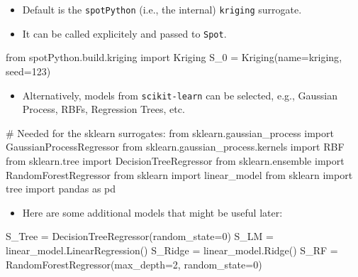 \documentclass[
  letterpaper,
  DIV=11,
  numbers=noendperiod]{scrreprt}
\newenvironment{Shaded}{\begin{snugshade}}{\end{snugshade}}
\newcommand{\CommentTok}[1]{\textcolor[rgb]{0.37,0.37,0.37}{#1}}
\newcommand{\DecValTok}[1]{\textcolor[rgb]{0.68,0.00,0.00}{#1}}
\newcommand{\ImportTok}[1]{\textcolor[rgb]{0.00,0.46,0.62}{#1}}
\newcommand{\NormalTok}[1]{\textcolor[rgb]{0.00,0.23,0.31}{#1}}
\newcommand{\OperatorTok}[1]{\textcolor[rgb]{0.37,0.37,0.37}{#1}}
\newcommand{\StringTok}[1]{\textcolor[rgb]{0.13,0.47,0.30}{#1}}
\providecommand{\tightlist}{%
  \setlength{\itemsep}{0pt}\setlength{\parskip}{0pt}}\usepackage{longtable,booktabs,array}
\begin{document}
\begin{itemize}
\tightlist
\item
  Default is the \texttt{spotPython} (i.e., the internal)
  \texttt{kriging} surrogate.
\item
  It can be called explicitely and passed to \texttt{Spot}.
\end{itemize}

\begin{Shaded}
\begin{Highlighting}[]
\ImportTok{from}\NormalTok{ spotPython.build.kriging }\ImportTok{import}\NormalTok{ Kriging}
\NormalTok{S\_0 }\OperatorTok{=}\NormalTok{ Kriging(name}\OperatorTok{=}\StringTok{\textquotesingle{}kriging\textquotesingle{}}\NormalTok{, seed}\OperatorTok{=}\DecValTok{123}\NormalTok{)}
\end{Highlighting}
\end{Shaded}

\begin{itemize}
\tightlist
\item
  Alternatively, models from \texttt{scikit-learn} can be selected,
  e.g., Gaussian Process, RBFs, Regression Trees, etc.
\end{itemize}

\begin{Shaded}
\begin{Highlighting}[]
\CommentTok{\# Needed for the sklearn surrogates:}
\ImportTok{from}\NormalTok{ sklearn.gaussian\_process }\ImportTok{import}\NormalTok{ GaussianProcessRegressor}
\ImportTok{from}\NormalTok{ sklearn.gaussian\_process.kernels }\ImportTok{import}\NormalTok{ RBF}
\ImportTok{from}\NormalTok{ sklearn.tree }\ImportTok{import}\NormalTok{ DecisionTreeRegressor}
\ImportTok{from}\NormalTok{ sklearn.ensemble }\ImportTok{import}\NormalTok{ RandomForestRegressor}
\ImportTok{from}\NormalTok{ sklearn }\ImportTok{import}\NormalTok{ linear\_model}
\ImportTok{from}\NormalTok{ sklearn }\ImportTok{import}\NormalTok{ tree}
\ImportTok{import}\NormalTok{ pandas }\ImportTok{as}\NormalTok{ pd}
\end{Highlighting}
\end{Shaded}

\begin{itemize}
\tightlist
\item
  Here are some additional models that might be useful later:
\end{itemize}

\begin{Shaded}
\begin{Highlighting}[]
\NormalTok{S\_Tree }\OperatorTok{=}\NormalTok{ DecisionTreeRegressor(random\_state}\OperatorTok{=}\DecValTok{0}\NormalTok{)}
\NormalTok{S\_LM }\OperatorTok{=}\NormalTok{ linear\_model.LinearRegression()}
\NormalTok{S\_Ridge }\OperatorTok{=}\NormalTok{ linear\_model.Ridge()}
\NormalTok{S\_RF }\OperatorTok{=}\NormalTok{ RandomForestRegressor(max\_depth}\OperatorTok{=}\DecValTok{2}\NormalTok{, random\_state}\OperatorTok{=}\DecValTok{0}\NormalTok{)}
\end{Highlighting}
\end{Shaded}
\end{document}
